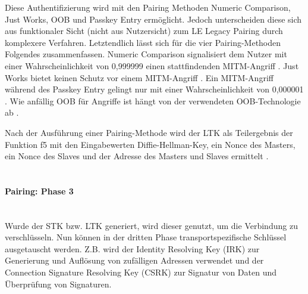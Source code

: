 Diese Authentifizierung wird mit den Pairing Methoden Numeric Comparison, Just Works, OOB und Passkey Entry ermöglicht. Jedoch unterscheiden diese sich aus funktionaler Sicht (nicht aus Nutzersicht) zum LE Legacy Pairing durch komplexere Verfahren. Letztendlich lässt sich für die vier Pairing-Methoden Folgendes zusammenfassen. Numeric Comparison signalisiert dem Nutzer mit einer Wahrscheinlichkeit von 0,999999 einen stattfindenden MITM-Angriff \cite{BtSpec4.2_2309}. 
Just Works bietet keinen Schutz vor einem MITM-Angriff \cite{BtSpec4.2_245}. 
Ein MITM-Angriff während des Passkey Entry gelingt nur mit einer Wahrscheinlichkeit von 0,000001 \cite{BtSpec4.2_2311}. 
Wie anfällig OOB für Angriffe ist hängt von der verwendeten OOB-Technologie ab \cite{BtSpec4.2_2312-2313}.

Nach der Ausführung einer Pairing-Methode wird der LTK als Teilergebnis der Funktion f5 \cite{BtSpec4.2_2292-2293} 
mit den Eingabewerten Diffie-Hellman-Key, ein Nonce des Masters, ein Nonce des Slaves und der Adresse des Masters und Slaves ermittelt \cite{BtSpec4.2_2314}.
\\\\

\paragraph{Pairing: Phase 3} \mbox{} \vspace{0.2cm} \\

Wurde der STK bzw. LTK generiert, wird dieser genutzt, um die Verbindung zu verschlüsseln. Nun können in der dritten Phase transportspezifische Schlüssel ausgetauscht werden. Z.B. wird der Identity Resolving Key (IRK) zur Generierung und Auflösung von zufälligen Adressen verwendet und der Connection Signature Resolving Key (CSRK) zur Signatur von Daten und Überprüfung von Signaturen.



